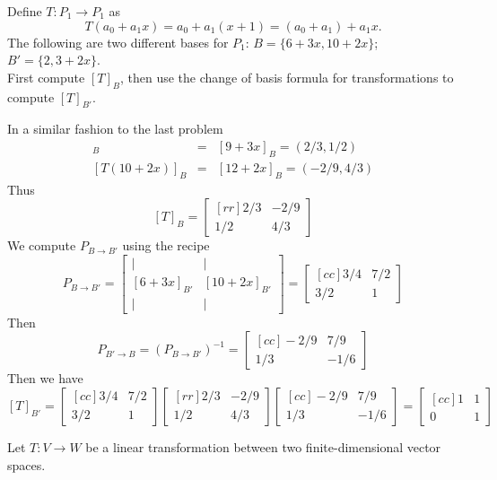 \ii Define $T\colon P_1\rightarrow P_1$ as 
$$
T(a_0 +a_1x) = a_0 +a_1(x+1) = (a_0 +a_1) +a_1x.
$$
The following are two different bases for $P_1$: $B = \{6+3x, 10+2x\}$; $B' = \{2,3+2x\}$.
\\
First compute $[T]_B$, then use the change of basis formula for transformations to compute $[T]_{B'}$. 
\\
\begin{solution}
\noindent In a similar fashion to the last problem
\begin{eqnarray*}
 [T(6+3x)]_B &=& [9+3x]_B=(2/3, 1/2) \\
 \left[T(10+2x)\right]_B &=& [12 +2x]_B=(-2/9,4/3)
\end{eqnarray*}
Thus
$$
[T]_B =
\begin{bmatrix}[rr]
2/3&-2/9\\
1/2&4/3
\end{bmatrix}
$$
We compute $P_{B\rightarrow B'}$ using the recipe
$$
P_{B\rightarrow B'} =\begin{bmatrix}
\vert&\vert \\
[6+3x]_{B'}&[10+2x]_{B'}\\
\vert&\vert
\end{bmatrix}
=
\begin{bmatrix}[cc]
3/4&7/2\\
3/2&1
\end{bmatrix}
$$
Then 
$$P_{B'\rightarrow B}=(P_{B\rightarrow B'})^{-1}=
\begin{bmatrix}[cc]
-2/9&7/9\\
1/3&-1/6
\end{bmatrix}
$$
Then we have 
$$
[T]_{B'} =
\begin{bmatrix}[cc]
3/4&7/2\\
3/2&1
\end{bmatrix}
\begin{bmatrix}[rr]
2/3&-2/9\\
1/2&4/3
\end{bmatrix}
\begin{bmatrix}[cc]
-2/9&7/9\\
1/3&-1/6
\end{bmatrix}
=
\begin{bmatrix}[cc]
1&1\\
0&1
\end{bmatrix}
$$
\end{solution}
\ii Let $T\colon V\rightarrow W$ be a linear transformation between two finite-dimensional vector spaces. 

